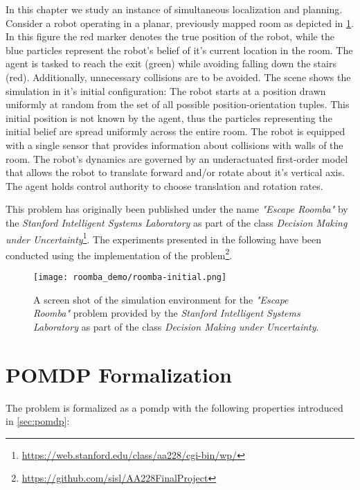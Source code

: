 In this chapter we study an instance of simultaneous localization and planning.
Consider a robot operating in a planar, previously mapped room as depicted in
\cref{fig:roomba-env}. In this figure the red marker denotes the true position
of the robot, while the blue particles represent the robot's belief of it's
current location in the room. The agent is tasked to reach the exit (green)
while avoiding falling down the stairs (red). Additionally, unnecessary
collisions are to be avoided. The scene shows the simulation in it's initial
configuration: The robot starts at a position drawn uniformly at random from
the set of all possible position-orientation tuples. This initial position is
not known by the agent, thus the particles representing the initial belief are
spread uniformly across the entire room. The robot is equipped with a single
sensor that provides information about collisions with walls of the room. The
robot's dynamics are governed by an underactuated first-order model that allows
the robot to translate forward and/or rotate about it's vertical axis. The
agent holds control authority to choose translation and rotation rates.

This problem has originally been published under the name \emph{"Escape
Roomba"} by the \emph{Stanford Intelligent Systems Laboratory} as part of the
class \emph{Decision Making under
Uncertainty}\footnote{\url{https://web.stanford.edu/class/aa228/cgi-bin/wp/}}.
The experiments presented in the following have been conducted using the
\pomdpsjl implementation of the
problem\footnote{\url{https://github.com/sisl/AA228FinalProject}}.

\begin{figure}[htpb]
  \centering
  \texttt{[image: roomba\_demo/roomba-initial.png]}
  \caption{A screen shot of the simulation environment for the \emph{"Escape
  Roomba"} problem provided by the \emph{Stanford Intelligent Systems
  Laboratory} as part of the class \emph{Decision Making under Uncertainty}.}
  \label{fig:roomba-env}
\end{figure}

\clearpage
\section{POMDP Formalization}\label{sec:lp-pomdp-formalization}

The problem is formalized as a \ac{pomdp} with the following properties introduced in \cref{sec:pomdp}:


